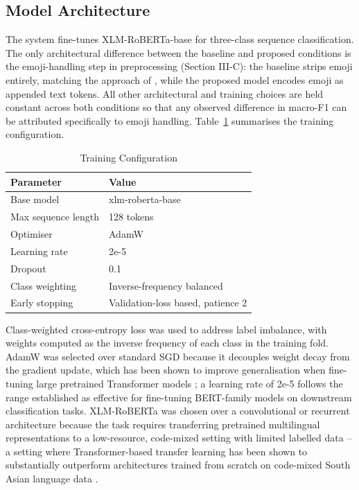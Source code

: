 \documentclass[journal]{IEEEtran}
\begin{document}
\subsection{Model Architecture}

The system fine-tunes XLM-RoBERTa-base \cite{conneau2020} for three-class
sequence classification. The only architectural difference between the
baseline and proposed conditions is the emoji-handling step in
preprocessing (Section III-C): the baseline strips emoji entirely,
matching the approach of \cite{muthuthanthri2024}, while the proposed
model encodes emoji as appended text tokens. All other architectural and
training choices are held constant across both conditions so that any
observed difference in macro-F1 can be attributed specifically to emoji
handling. Table~\ref{tab:training-config} summarises the training
configuration.

\begin{table}[h]
\centering
\caption{Training Configuration}
\label{tab:training-config}
\begin{tabular}{@{}ll@{}}
\toprule
Parameter & Value \\
\midrule
Base model & xlm-roberta-base \\
Max sequence length & 128 tokens \\
Optimiser & AdamW \\
Learning rate & 2e-5 \\
Dropout & 0.1 \\
Class weighting & Inverse-frequency balanced \\
Early stopping & Validation-loss based, patience 2 \\
\bottomrule
\end{tabular}
\end{table}

Class-weighted cross-entropy loss was used to address label imbalance,
with weights computed as the inverse frequency of each class in the
training fold. AdamW was selected over standard SGD because it decouples
weight decay from the gradient update, which has been shown to improve
generalisation when fine-tuning large pretrained Transformer models
\cite{conneau2020}; a learning rate of 2e-5 follows the range
established as effective for fine-tuning BERT-family models on
downstream classification tasks. XLM-RoBERTa was chosen over a
convolutional or recurrent architecture because the task requires
transferring pretrained multilingual representations to a low-resource,
code-mixed setting with limited labelled data -- a setting where
Transformer-based transfer learning has been shown to substantially
outperform architectures trained from scratch on code-mixed South Asian
language data \cite{vasantharajan2022,mozafari2020}.
\end{document}
